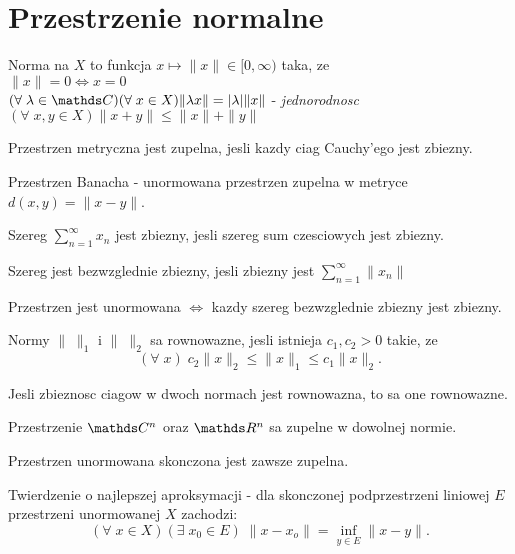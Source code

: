 \section{Przestrzenie normalne}

\begin{multicols}{2}
    
    {\color{def}Norma} na $X$ to funkcja $x\mapsto \|x\|\in[0, \infty)$ taka, ze\smallskip\\
        \point $\|x\|=0\iff x=0$\smallskip\\
        \point $(\forall\;\lambda\in\C)(\forall\;x\in X) \|\lambda x\|=|\lambda|\|x\|$ - \emph{jednorodnosc}\smallskip\\
        \point $(\forall\;x,y\in X)\| x+y\| \leq \|x\|+\|y\|$
    \bigskip

    Przestrzen metryczna jest {\color{def}zupelna}, jesli kazdy ciag Cauchy'ego jest zbiezny.
    \medskip

    {\color{def}Przestrzen Banacha} - unormowana przestrzen zupelna w metryce $d(x, y)=\|x-y\|$.
    \bigskip

    \pdef

    Szereg $\sum\limits_{n=1}^\infty x_n$ jest {\color{acc}zbiezny}, jesli szereg sum czesciowych jest zbiezny.\\

    \kdef

    Szereg jest {\color{acc}bezwzglednie zbiezny}, jesli zbiezny jest $\sum\limits_{n=1}^\infty\|x_n\|$
    \medskip

    \pdef
    
    Przestrzen jest unormowana $\iff$ kazdy szereg bezwzglednie zbiezny jest zbiezny.


    \kdef
    \medskip

    Normy $\|\;\|_1$ i $\|\;\|_2$ sa {\color{def}rownowazne}, jesli istnieja $c_1, c_2>0$ takie, ze
    $$(\forall\;x)\;c_2\|x\|_2\leq \|x\|_1\leq c_1\|x\|_2.$$

    {\color{acc}\point} Jesli zbieznosc ciagow w dwoch normach jest rownowazna, to sa one rownowazne.

    {\color{acc}\point} Przestrzenie $\C^n$ oraz $\R^n$ sa zupelne w dowolnej normie.

    {\color{acc}\point} Przestrzen unormowana skonczona jest zawsze zupelna.
    \medskip

    {\color{def}Twierdzenie o najlepszej aproksymacji} - dla skonczonej podprzestrzeni liniowej $E$ przestrzeni unormowanej $X$ zachodzi:
    $$(\forall\;x\in X)(\exists\;x_0\in E)\;\|x-x_o\|=\inf\limits_{y\in E}\|x-y\|.$$


\end{multicols}
